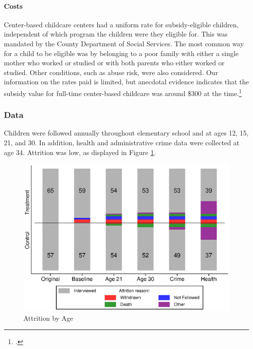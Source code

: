 \begin{appendices}
\paragraph{Costs}

\noindent Center-based childcare centers had a uniform rate for subsidy-eligible children, independent of which program the children were they eligible for. This was mandated by the County Department of Social Services. The most common way for a child to be eligible was by belonging to a poor family with either a single mother who worked or studied or with both parents who either worked or studied. Other conditions, such as abuse risk, were also considered. Our information on the rates paid is limited, but anecdotal evidence indicates that the subsidy value for full-time center-based childcare was around \$300 at the time.\footnote{\citet{Kuperman_2015_Clifford-Russell-Interview}.}

\subsubsection{Data} \label{appendix:data}

Children were followed annually throughout elementary school and at ages 12, 15, 21, and 30. In addition, health and administrative crime data were collected at age 34.  Attrition was low, as displayed in Figure \ref{fig:attrition}.\\

\begin{figure}[H]
\caption{Attrition by Age} \label{fig:attrition}
    \centering
  \includegraphics[width=.9\columnwidth]{output/abc_attrition.eps}
\end{figure}


\end{appendices}
